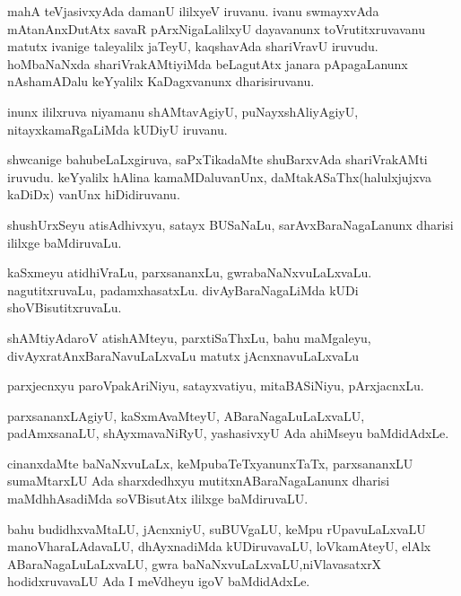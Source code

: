 \documentclass{article}
\begin{document}
\begin{mn}
mahA teVjasivxyAda damanU ililxyeV iruvanu. ivanu swmayxvAda mAtanAnxDutAtx 
savaR pArxNigaLalilxyU dayavanunx toVrutitxruvavanu matutx ivanige taleyalilx 
jaTeyU, kaqshavAda shariVravU iruvudu. hoMbaNaNxda shariVrakAMtiyiMda beLagutAtx
janara pApagaLanunx nAshamADalu keYyalilx KaDagxvanunx dharisiruvanu.
\end{mn}

\begin{mn}
inunx ililxruva niyamanu shAMtavAgiyU, puNayxshAliyAgiyU, nitayxkamaRgaLiMda kUDiyU iruvanu.
\end{mn}

\begin{mn}
shwcanige bahubeLaLxgiruva, saPxTikadaMte shuBarxvAda shariVrakAMti iruvudu. 
keYyalilx hAlina kamaMDaluvanUnx, daMtakASaThx(halulxjujxva kaDiDx) vanUnx hiDidiruvanu.
\end{mn}

\begin{mn}
shushUrxSeyu atisAdhivxyu, satayx BUSaNaLu, sarAvxBaraNagaLanunx dharisi ililxge baMdiruvaLu.
\end{mn}

\begin{mn}
kaSxmeyu atidhiVraLu, parxsananxLu, gwrabaNaNxvuLaLxvaLu. nagutitxruvaLu,
 padamxhasatxLu. divAyBaraNagaLiMda kUDi shoVBisutitxruvaLu.
\end{mn}

\begin{mn}
shAMtiyAdaroV atishAMteyu, parxtiSaThxLu, bahu maMgaleyu, divAyxratAnxBaraNavuLaLxvaLu 
matutx jAcnxnavuLaLxvaLu
\end{mn}

\begin{mn}
parxjecnxyu paroVpakAriNiyu, satayxvatiyu, mitaBASiNiyu, pArxjacnxLu.
\end{mn}

\begin{mn}
parxsananxLAgiyU, kaSxmAvaMteyU, ABaraNagaLuLaLxvaLU, padAmxsanaLU, shAyxmavaNiRyU, 
yashasivxyU Ada ahiMseyu baMdidAdxLe.
\end{mn}

\begin{mn}
cinanxdaMte baNaNxvuLaLx, keMpubaTeTxyanunxTaTx, parxsananxLU sumaMtarxLU 
Ada sharxdedhxyu mutitxnABaraNagaLanunx dharisi maMdhhAsadiMda soVBisutAtx 
ililxge baMdiruvaLU.
\end{mn}

\begin{mn}
bahu budidhxvaMtaLU, jAcnxniyU, suBUVgaLU, keMpu rUpavuLaLxvaLU manoVharaLAdavaLU,
 dhAyxnadiMda kUDiruvavaLU, loVkamAteyU, elAlx ABaraNagaLuLaLxvaLU, gwra 
 baNaNxvuLaLxvaLU,niVlavasatxrX hodidxruvavaLU Ada I meVdheyu igoV baMdidAdxLe.
\end{mn}
\end{document}
